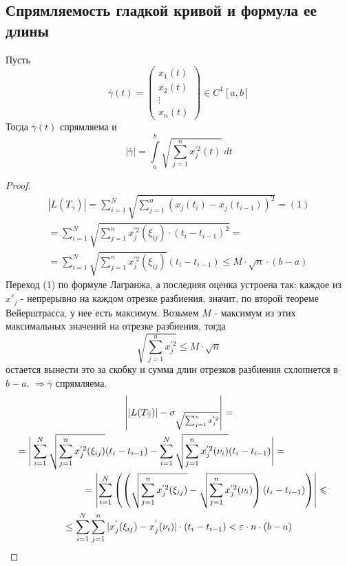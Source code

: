 \subsection{Спрямляемость гладкой кривой и формула ее длины}
\begin{theorem}
    Пусть 
    \[\bar{\gamma}(t) = 
    \begin{pmatrix}
    x_1(t)\\
    x_2(t)\\
    \vdots\\
    x_n(t)
    \end{pmatrix} \in C^1[a,b]\]
    Тогда $\bar{\gamma}(t)$ спрямляема и
    \[|\bar{\gamma}| = \int\limits_{a}^{b} \sqrt{\sum_{j = 1}^{n} x_j^{'2}(t)}\ dt\]
\end{theorem}
\begin{proof}
    \begin{multline*}
        |L(T_{\bar{\gamma}})| = \sum_{i = 1}^{N} \sqrt{ \sum_{j = 1}^{n}(x_j(t_i) - x_j(t_{i - 1}))^2} = (1)\\
        = \sum_{i = 1}^{N} \sqrt{\sum_{j = 1}^{n} x_j^{'2}(\xi_{ij}) \cdot (t_i - t_{i - 1})^2} =\\
        = \sum_{i = 1}^{N} \sqrt{\sum_{j = 1}^{n} x_j^{'2} (\xi_{ij})} (t_i - t_{i - 1}) \leqslant M \cdot \sqrt{n} \cdot (b - a)
    \end{multline*}
    Переход (1) по формуле Лагранжа, а последняя оценка устроена так: каждое из $x'_{j}$ - непрерывно на каждом отрезке разбиения, значит, по второй теореме Вейерштрасса, у нее есть максимум. Возьмем $M$ - максимум из этих максимальных значений на отрезке разбиения, тогда 
    \[\sqrt{\sum\limits_{j=1}^{n}x_j^{'2}}\leq M\cdot \sqrt{n}\]
    остается вынести это за скобку и сумма длин отрезков разбиения схлопнется в $b-a$.
    $\Rightarrow \bar{\gamma}$ спрямляема.
    \newpage
    \begin{multline*}
        \left| |L(T_{\bar{\gamma}})| - \sigma_{\sqrt{\sum_{j = 1}^{n} x_j^{'2}}} \right| =\\
        =\Bigg| \sum_{i = 1}^{N} \sqrt{\sum_{j = 1}^{n} x_j^{'2} (\xi_{ij})}(t_i - t_{i - 1}) - \sum_{i = 1}^{N} \sqrt{\sum_{j = 1}^{n} x_j^{'2} (\nu_{i})}(t_i - t_{i - 1}) \Bigg| =\tab[2cm]\\ 
        \tab[2cm]=\left| \sum_{i=1}^{N} \left( \left( \sqrt{\sum_{j = 1}^{n} x_j^{'2} (\xi_{ij})} - \sqrt{\sum_{j = 1}^{n} x_j^{'2} (\nu_{i})}  \right) (t_i - t_{i - 1}) \right) \right| \leqslant\\
        \leq \sum_{i = 1}^{N} \sum_{j = 1}^{n} |x_j^{'} (\xi_{ij}) - x_j^{'} (\nu_i)| \cdot (t_i - t_{i - 1}) < \epsilon \cdot n \cdot (b - a)

\end{multline*}
\end{proof}
